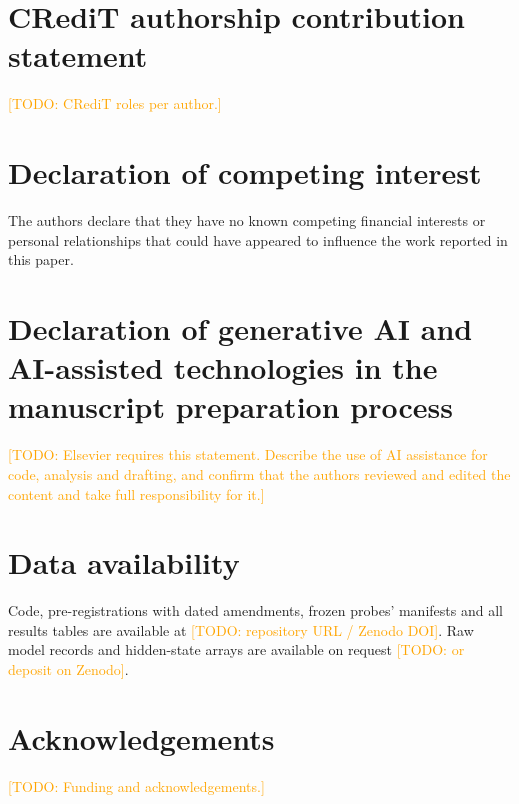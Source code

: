 \documentclass[review,12pt]{elsarticle}
\theoremstyle{remark}
\newcommand{\todo}[1]{\textcolor{orange}{[TODO: #1]}}
\begin{document}










\section*{CRediT authorship contribution statement}
\todo{CRediT roles per author.}

\section*{Declaration of competing interest}
The authors declare that they have no known competing financial interests or personal relationships that could have
appeared to influence the work reported in this paper.

\section*{Declaration of generative AI and AI-assisted technologies in the manuscript preparation process}
\todo{Elsevier requires this statement. Describe the use of AI assistance for code, analysis and drafting, and
confirm that the authors reviewed and edited the content and take full responsibility for it.}

\section*{Data availability}
Code, pre-registrations with dated amendments, frozen probes' manifests and all results tables are available at
\todo{repository URL / Zenodo DOI}. Raw model records and hidden-state arrays are available on request
\todo{or deposit on Zenodo}.

\section*{Acknowledgements}
\todo{Funding and acknowledgements.}

\appendix




\end{document}
